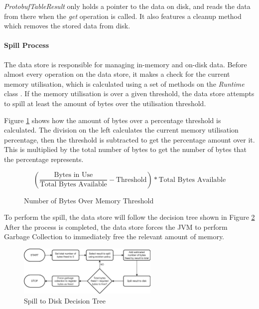 \textit{ProtobufTableResult} only holds a pointer to the data on disk, and reads the data from there when the \textit{get} operation is called. It also features a cleanup method which removes the stored data from disk.

\paragraph{Spill Process}
The data store is responsible for managing in-memory and on-disk data. Before almost every operation on the data store, it makes a check for the current memory utilisation, which is calculated using a set of methods on the \textit{Runtime} class \cite{javaruntimeclass}. If the memory utilisation is over a given threshold, the data store attempts to spill at least the amount of bytes over the utilisation threshold. 

Figure \ref{fig:bytes-over-memory-threshold} shows how the amount of bytes over a percentage threshold is calculated. The division on the left calculates the current memory utilisation percentage, then the threshold is subtracted to get the percentage amount over it. This is multiplied by the total number of bytes to get the number of bytes that the percentage represents.

\begin{figure}[h]
	\centering
	\[ \left( \frac{\text{Bytes in Use}}{\text{Total Bytes Available}} - \text{Threshold} \right) * \text{Total Bytes Available} \]
	\caption{Number of Bytes Over Memory Threshold}
	\label{fig:bytes-over-memory-threshold}
\end{figure}

To perform the spill, the data store will follow the decision tree shown in Figure \ref{fig:spill-to-disk-process} After the process is completed, the data store forces the JVM to perform Garbage Collection to immediately free the relevant amount of memory.

\begin{figure}[h]
	\centering
	\includegraphics[width=0.6\textwidth]{chapters/diagrams/implementation/spill-to-disk-process}
	\caption{Spill to Disk Decision Tree}
	\label{fig:spill-to-disk-process}
\end{figure}

